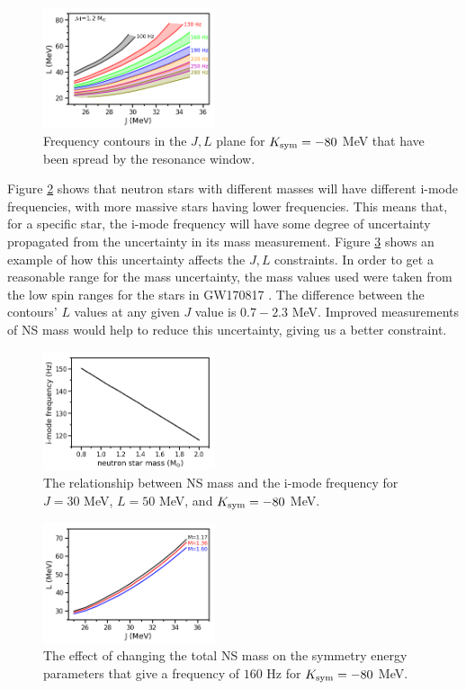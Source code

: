 \documentclass[fleqn,usenatbib]{mnras}
\begin{document}
\begin{figure}
\centering
\includegraphics[width=0.45\textwidth,angle=0]{JL_spread_due_to_df_grid_nonucl.png}
\caption{Frequency contours in the $J,L$ plane for $K_{\rm sym}=-80$ MeV that have been spread by the resonance window.}
\label{fig:t_res_spread}
\end{figure}

\hspace{\parindent}Figure \ref{fig:M_vs_f} shows that neutron stars with different masses will have different i-mode frequencies, with more massive stars having lower frequencies. This means that, for a specific star, the i-mode frequency will have some degree of uncertainty propagated from the uncertainty in its mass measurement. Figure \ref{fig:vary_mass_contours} shows an example of how this uncertainty affects the $J,L$ constraints. In order to get a reasonable range for the mass uncertainty, the mass values used were taken from the low spin ranges for the stars in GW170817 \citet{abbott2017merger}. The difference between the contours' $L$ values at any given $J$ value is $0.7-2.3$ MeV. Improved measurements of NS mass would help to reduce this uncertainty, giving us a better constraint.

\begin{figure}
\centering
\includegraphics[width=0.45\textwidth,angle=0]{M_vs_f_30_50_-80.png}
\caption{The relationship between NS mass and the i-mode frequency for $J=30$ MeV, $L=50$ MeV, and $K_{\rm sym}=-80$ MeV.}
\label{fig:M_vs_f}
\end{figure}

\begin{figure}
\centering
\includegraphics[width=0.45\textwidth,angle=0]{Mcomp_f160_30_50_-80.png}
\caption{The effect of changing the total NS mass on the symmetry energy parameters that give a frequency of $160$ Hz for $K_{\rm sym}=-80$ MeV.}
\label{fig:vary_mass_contours}
\end{figure}
\end{document}
